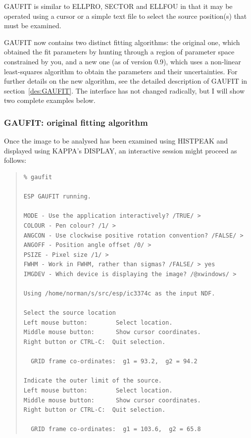 \documentclass[twoside,11pt]{article}
\newcommand{\xref}[3]{#1}
\newenvironment{myquote}{\begin{quote}\begin{small}}{\end{small}\end{quote}}
\begin{document}
GAUFIT is similar to ELLPRO, SECTOR and ELLFOU in that it may be operated
using a cursor or a simple text file to select the source position(s) that 
must be examined. 

GAUFIT now contains two distinct fitting algorithms: the original one,
which obtained the fit parameters by hunting through a region of
parameter space constrained by you, and a new one (as of version 0.9),
which uses a non-linear least-squares algorithm to obtain the
parameters and their uncertainties.  For further details on the new
algorithm, see the detailed description of GAUFIT in
section~\ref{des:GAUFIT}.  The interface has not changed radically,
but I will show two complete examples below.

\subsubsection{GAUFIT: original fitting algorithm}

Once the image to be analysed has been examined using 
HISTPEAK and displayed using \xref{KAPPA}{sun95}{}'s DISPLAY, an interactive 
session might proceed as follows:

\begin{myquote}
\begin{verbatim}
% gaufit 
 
ESP GAUFIT running.
 
MODE - Use the application interactively? /TRUE/ > 
COLOUR - Pen colour? /1/ > 
ANGCON - Use clockwise positive rotation convention? /FALSE/ > 
ANGOFF - Position angle offset /0/ > 
PSIZE - Pixel size /1/ > 
FWHM - Work in FWHM, rather than sigmas? /FALSE/ > yes
IMGDEV - Which device is displaying the image? /@xwindows/ > 
 
Using /home/norman/s/src/esp/ic3374c as the input NDF.
 
Select the source location
Left mouse button:        Select location.
Middle mouse button:      Show cursor coordinates.
Right button or CTRL-C:  Quit selection.

  GRID frame co-ordinates:  g1 = 93.2,  g2 = 94.2
 
Indicate the outer limit of the source.
Left mouse button:        Select location.
Middle mouse button:      Show cursor coordinates.
Right button or CTRL-C:  Quit selection.

  GRID frame co-ordinates:  g1 = 103.6,  g2 = 65.8
\end{verbatim}
\end{myquote}
\end{document}
